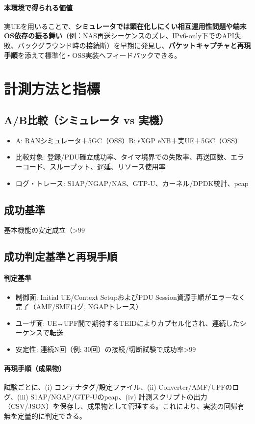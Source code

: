 \paragraph{本環境で得られる価値}
実UEを用いることで、\textbf{シミュレータでは顕在化しにくい相互運用性問題や端末OS依存の振る舞い}（例：NAS再送シーケンスのズレ、IPv6-only下でのAPI失敗、バックグラウンド時の接続断）を早期に発見し、\textbf{パケットキャプチャと再現手順}を添えて標準化・OSS実装へフィードバックできる。

\section{計測方法と指標}
\subsection{A/B比較（シミュレータ vs 実機）}
\begin{itemize}
	\item A: RANシミュレータ＋5GC（OSS）\quad B: sXGP eNB＋実UE＋5GC（OSS）
	\item 比較対象: 登録/PDU確立成功率、タイマ境界での失敗率、再送回数、エラーコード、スループット、遅延、リソース使用率
	\item ログ・トレース: S1AP/NGAP/NAS、GTP-U、カーネル/DPDK統計、pcap
\end{itemize}
\subsection{成功基準}
基本機能の安定成立（>99%
\subsection{成功判定基準と再現手順}
\paragraph{判定基準}
\begin{itemize}
	\item 制御面: Initial UE/Context SetupおよびPDU Session資源手順がエラーなく完了（AMF/SMFログ, NGAPトレース）
	\item ユーザ面: UE↔UPF間で期待するTEIDによりカプセル化され、連続したシーケンスで転送
	\item 安定性: 連続N回（例: 30回）の接続/切断試験で成功率>99%
\end{itemize}
\paragraph{再現手順（成果物）}
試験ごとに、(i) コンテナタグ/設定ファイル、(ii) Converter/AMF/UPFのログ、(iii) S1AP/NGAP/GTP-Uのpcap、(iv) 計測スクリプトの出力（CSV/JSON）を保存し、成果物として管理する。これにより、実装の回帰有無を定量的に判定できる\cite{dtn_implementations}。

